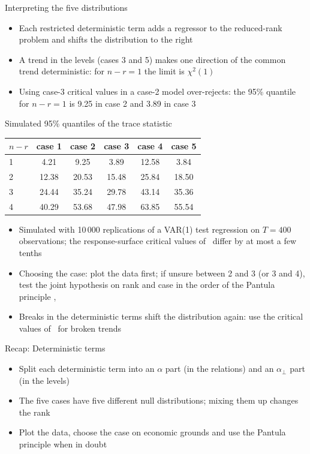 \begin{frame}{Interpreting the five distributions}
\itemsize{\small}
\begin{itemize}
    \item Each restricted deterministic term adds a regressor to the reduced-rank problem and shifts the distribution to the right
    \item A trend in the levels (cases 3 and 5) makes one direction of the common trend deterministic: for $n - r = 1$ the limit is $\chi^2(1)$
    \item Using case-3 critical values in a case-2 model over-rejects: the 95\% quantile for $n - r = 1$ is 9.25 in case 2 and 3.89 in case 3
\end{itemize}
\end{frame}

\begin{frame}{Simulated 95\% quantiles of the trace statistic}
\itemsize{\small}
\begin{center}
\footnotesize
\begin{tabular}{lccccc}
\toprule
$n - r$ & case 1 & case 2 & case 3 & case 4 & case 5 \\
\midrule
1 & 4.21 & 9.25 & 3.89 & 12.58 & 3.84 \\
2 & 12.38 & 20.53 & 15.48 & 25.84 & 18.50 \\
3 & 24.44 & 35.24 & 29.78 & 43.14 & 35.36 \\
4 & 40.29 & 53.68 & 47.98 & 63.85 & 55.54 \\
\bottomrule
\end{tabular}
\end{center}
\begin{itemize}
    \item Simulated with 10\,000 replications of a VAR(1) test regression on $T = 400$ observations; the response-surface critical values of \ differ by at most a few tenths
    \item Choosing the case: plot the data first; if unsure between 2 and 3 (or 3 and 4), test the joint hypothesis on rank and case in the order of the Pantula principle , 
    \item Breaks in the deterministic terms shift the distribution again: use the critical values of \ for broken trends
\end{itemize}
\end{frame}

\begin{frame}{Recap: Deterministic terms}
\itemsize{\small}
\begin{itemize}
    \item Split each deterministic term into an $\alpha$ part (in the relations) and an $\alpha_\perp$ part (in the levels)
    \item The five cases have five different null distributions; mixing them up changes the rank
    \item Plot the data, choose the case on economic grounds and use the Pantula principle when in doubt
\end{itemize}
\end{frame}


